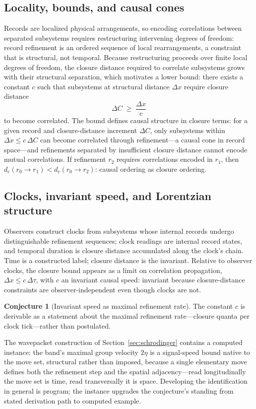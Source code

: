 \documentclass[11pt]{article}
\theoremstyle{definition}
\newtheorem{conjecture}{Conjecture}
\theoremstyle{remark}
\begin{document}
\subsection{Locality, bounds, and causal cones}
Records are localized physical arrangements, so encoding correlations between separated subsystems requires restructuring intervening degrees of freedom: record refinement is an ordered sequence of local rearrangements, a constraint that is structural, not temporal. Because restructuring proceeds over finite local degrees of freedom, the closure distance required to correlate subsystems grows with their structural separation, which motivates a lower bound: there exists a constant $c$ such that subsystems at structural distance $\Delta x$ require closure distance
\[ \Delta C \;\ge\; \frac{\Delta x}{c} \]
to become correlated. The bound defines causal structure in closure terms: for a given record and closure-distance increment $\Delta C$, only subsystems within $\Delta x \le c\,\Delta C$ can become correlated through refinement---a causal cone in record space---and refinements separated by insufficient closure distance cannot encode mutual correlations. If refinement $r_2$ requires correlations encoded in $r_1$, then $d_c(r_0 \to r_1) < d_c(r_0 \to r_2)$: causal ordering as closure ordering.

\subsection{Clocks, invariant speed, and Lorentzian structure}
Observers construct clocks from subsystems whose internal records undergo distinguishable refinement sequences; clock readings are internal record states, and temporal duration is closure distance accumulated along the clock's chain. Time is a constructed label; closure distance is the invariant. Relative to observer clocks, the closure bound appears as a limit on correlation propagation, $\Delta x \le c\,\Delta\tau$, with $c$ an invariant causal speed: invariant because closure-distance constraints are observer-independent even though clocks are not.

\begin{conjecture}[Invariant speed as maximal refinement rate]\label{conj:speed}
The constant $c$ is derivable as a statement about the maximal refinement rate---closure quanta per clock tick---rather than postulated.
\end{conjecture}

The wavepacket construction of Section~\ref{sec:schrodinger} contains a computed instance: the band's maximal group velocity $2\eta$ is a signal-speed bound native to the move set, structural rather than imposed, because a single elementary move defines both the refinement step and the spatial adjacency---read longitudinally the move set is time, read transversally it is space. Developing the identification in general is program; the instance upgrades the conjecture's standing from stated derivation path to computed example.
\end{document}
